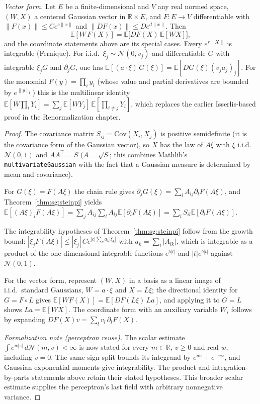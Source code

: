 \begin{theorem}
\emph{Vector form.} Let $E$ be a finite-dimensional and $V$ any real normed space, $(W,X)$ a centered Gaussian
vector in $\mathbb R\times E$, and $F:E\to V$ differentiable with $\|F(x)\|\le Ce^{c\|x\|}$ and
$\|DF(x)\|\le De^{d\|x\|}$. Then
\[\mathbb E[W\,F(X)]=\mathbb E\bigl[DF(X)\,\mathbb E[WX]\bigr],\]
and the coordinate statements above are its special cases. Every $e^{r\|X\|}$ is integrable (Fernique). For i.i.d.\
$\xi_j\sim\mathcal N(0,v_j)$ and differentiable $G$ with integrable $\xi_jG$ and $\partial_jG$, one has
$\mathbb E[(a\cdot\xi)\,G(\xi)]=\mathbb E[DG(\xi)(v_ja_j)_j]$. For the monomial $F(y)=\prod_iy_i$ (whose value and
partial derivatives are bounded by $e^{\|y\|_1}$) this is the multilinear identity
$\mathbb E[W\prod_iY_i]=\sum_j\mathbb E[WY_j]\,\mathbb E[\prod_{i\ne j}Y_i]$, which replaces the earlier
Isserlis-based proof in the Renormalization chapter.
\end{theorem}

\begin{proof}
  \leanok
The covariance matrix $S_{ij}=\mathrm{Cov}(X_i,X_j)$ is positive semidefinite (it is the covariance form of the Gaussian
vector), so $X$ has the law of $A\xi$ with $\xi$ i.i.d.\ $\mathcal N(0,1)$ and $AA^\top=S$ ($A=\sqrt S$; this combines Mathlib's
\texttt{multivariateGaussian} with the fact that a Gaussian measure is determined by mean and covariance). 

For $G(\xi)=F(A\xi)$
the chain rule gives $\partial_jG(\xi)=\sum_lA_{lj}\partial_lF(A\xi)$, and Theorem~\ref{thm:sg:steinpi} yields
$\mathbb E[(A\xi)_iF(A\xi)]=\sum_jA_{ij}\sum_lA_{lj}\mathbb E[\partial_lF(A\xi)]=\sum_lS_{il}\mathbb E[\partial_lF(A\xi)]$.

The integrability hypotheses of Theorem~\ref{thm:sg:steinpi} follow from the growth bound:
$|\xi_jF(A\xi)|\le|\xi_j|\,Ce^{|c|\sum_ka_k|\xi_k|}$ with $a_k=\sum_l|A_{lk}|$, which is integrable as a product of the
one-dimensional integrable functions $e^{b|t|}$ and $|t|e^{b|t|}$ against $\mathcal N(0,1)$. 

For the vector form, represent $(W,X)$ in a basis as a linear image of i.i.d.\ standard Gaussians, $W=a\cdot\xi$ and
$X=L\xi$; the directional identity for $G=F\circ L$ gives
$\mathbb E[WF(X)]=\mathbb E[DF(L\xi)\,La]$, and applying it to $G=L$ shows $La=\mathbb E[WX]$. The coordinate form with an
auxiliary variable $W_i$ follows by expanding $DF(X)v=\sum_lv_l\,\partial_lF(X)$.

\emph{Formalization note (perceptron reuse).} The scalar estimate
$\int e^{w|z|}\,d\mathcal N(m,v)<\infty$ is now stated for every $m\in\mathbb R$,
$v\ge0$ and real $w$, including $v=0$. The same sign split bounds its integrand by
$e^{wz}+e^{-wz}$, and Gaussian exponential moments give integrability. The product
and integration-by-parts statements above retain their stated hypotheses. This broader
scalar estimate supplies the perceptron's last field with arbitrary nonnegative variance.
\end{proof}


